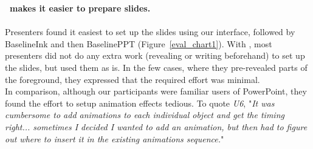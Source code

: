 %
\textbf{\interface\ makes it easier to prepare slides.}\\
\\
Presenters found it easiest to set up the slides using our interface, followed by BaselineInk and then BaselinePPT (Figure~\ref{eval_chart1}). With \interface, most presenters did not do any extra work (revealing or writing beforehand) to set up the slides, but used them as is. In the few cases, where they pre-revealed parts of the foreground, they expressed that the required effort was minimal. \\
In comparison, although our participants were familiar users of PowerPoint, they found the effort to setup animation effects tedious. To quote \textit{U6}, "\textit{It was cumbersome to add animations to each individual object and get the timing right... sometimes I decided I wanted to add an animation, but then had to figure out where to insert it in the existing animations sequence.}"\\
